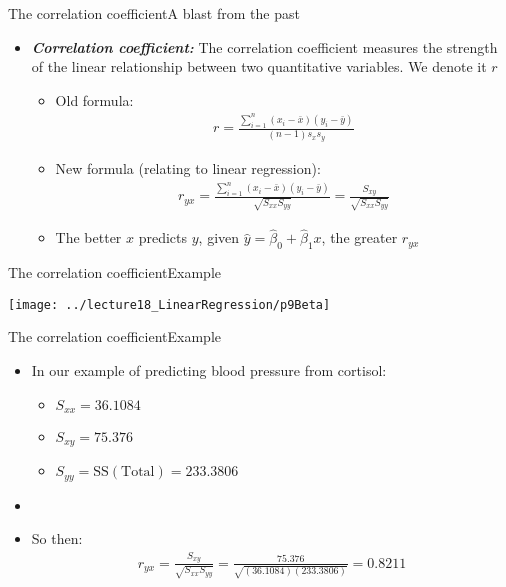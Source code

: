 \documentclass[xcolor=dvipsnames]{beamer}
\begin{document}
\begin{frame}{The correlation coefficient}{A blast from the past}
	\begin{itemize}
		\item \textbf{\emph{Correlation coefficient:}} The correlation coefficient measures the strength of the linear relationship between two quantitative variables. We denote it $r$
		\begin{itemize}
					\item Old formula: 
			\begin{gather*}
			r = \frac{\sum_{i=1}^n(x_i -\bar{x})(y_i - \bar{y})}{(n-1) s_x s_y}
			\end{gather*} \pause
			\item New formula (relating to linear regression):
			\begin{gather*}
			r_{yx} = \frac{\sum_{i = 1}^n (x_i - \bar{x})(y_i - \bar{y})}{\sqrt{S_{xx}S_{yy}}} = \frac{S_{xy}}{\sqrt{S_{xx}S_{yy}}}
			\end{gather*} \pause
			\item The better $x$ predicts $y$, given $\hat{y}=\hat{\beta}_0 + \hat{\beta}_1 x$, the greater $r_{yx}$
		\end{itemize}
	\end{itemize}
\end{frame}

\begin{frame}{The correlation coefficient}{Example}
	\begin{center}
		\texttt{[image: ../lecture18\_LinearRegression/p9Beta]}
	\end{center}
\end{frame}

\begin{frame}{The correlation coefficient}{Example}
	\begin{itemize}
	\item In our example of predicting blood pressure from cortisol: \pause
	\begin{itemize}
		\item $S_{xx} = 36.1084$ \pause
		\item $S_{xy} = 75.376$ \pause
		\item $S_{yy} = \text{SS}(\text{Total}) = 233.3806$ \pause
	\end{itemize}
	\item[]
		\item So then: \pause
		\begin{gather*}
		r_{yx} = \frac{S_{xy}}{\sqrt{S_{xx}S_{yy}}} = \frac{75.376}{\sqrt{(36.1084)(233.3806)}} = 0.8211
		\end{gather*}
	\end{itemize}
\end{frame}
\end{document}
